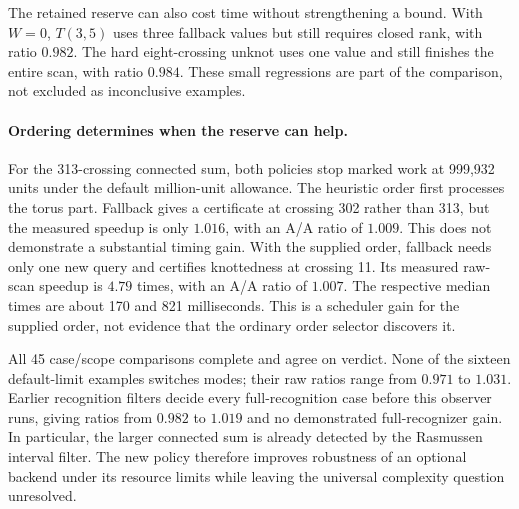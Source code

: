 The retained reserve can also cost time without strengthening a bound.
With $W=0$, $T(3,5)$ uses three fallback values but still requires closed
rank, with ratio $0.982$.  The hard eight-crossing unknot uses one value and
still finishes the entire scan, with ratio $0.984$.  These small regressions
are part of the comparison, not excluded as inconclusive examples.

\paragraph{Ordering determines when the reserve can help.}
For the 313-crossing connected sum, both policies stop marked work at 999,932
units under the default million-unit allowance.  The heuristic order first
processes the torus part.  Fallback gives a certificate at crossing 302
rather than 313, but the measured speedup is only $1.016$, with an A/A ratio
of $1.009$.  This does not demonstrate a substantial timing gain.
With the supplied order, fallback needs only one new query and certifies
knottedness at crossing 11.  Its measured raw-scan speedup is $4.79$ times,
with an A/A ratio of $1.007$.  The respective median times are about
170 and 821 milliseconds.  This is a scheduler gain for the supplied order,
not evidence that the ordinary order selector discovers it.

All 45 case/scope comparisons complete and agree on verdict.  None of the
sixteen default-limit examples switches modes; their raw ratios range from
$0.971$ to $1.031$.  Earlier recognition filters decide every full-recognition
case before this observer runs, giving ratios from $0.982$ to $1.019$ and
no demonstrated full-recognizer gain.  In particular, the larger connected
sum is already detected by the Rasmussen interval filter.  The new policy
therefore improves robustness of an optional backend under its resource
limits while leaving the universal complexity question unresolved.
